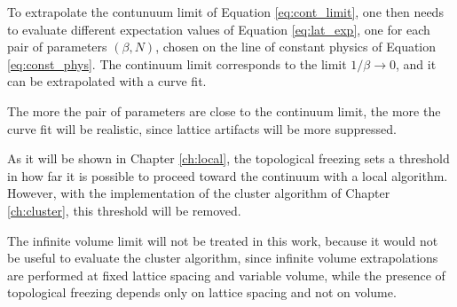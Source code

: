 To extrapolate the contunuum limit of Equation \eqref{eq:cont_limit},
one then needs to evaluate different expectation values of Equation \eqref{eq:lat_exp},
one for each pair of parameters $(\beta,N)$, chosen on the line of constant physics of Equation \eqref{eq:const_phys}.
The continuum limit corresponds to the limit $1/\beta\to0$, and it can be extrapolated with a curve fit.

The more the pair of parameters are close to the continuum limit, the more the curve fit will be realistic,
since lattice artifacts will be more suppressed. 

As it will be shown in Chapter \ref{ch:local}, the topological freezing sets a threshold in how far it is possible to proceed toward the continuum with a local algorithm.
However, with the implementation of the cluster algorithm of Chapter \ref{ch:cluster}, this threshold will be removed.

The infinite volume limit will not be treated in this work,
because it would not be useful to evaluate the cluster algorithm,
since infinite volume extrapolations are performed at fixed lattice spacing and variable volume,
while the presence of topological freezing depends only on lattice spacing and not on volume.

